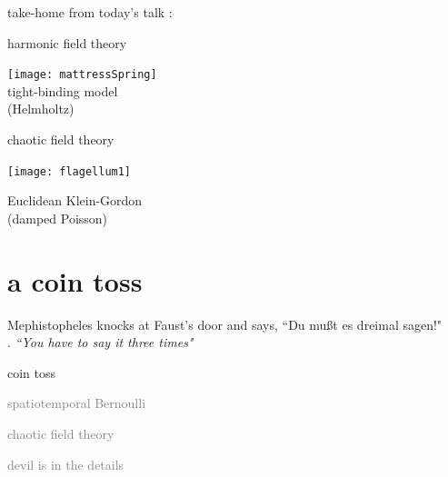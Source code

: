 \begin{frame}{take-home from today's talk :}
\begin{center}
            \begin{minipage}[c]{0.40\textwidth}\begin{center}
{\color{purple}harmonic} field theory
\bigskip

\texttt{[image: mattressSpring]}\\
{\color{blue}tight-binding} model \\ ({\color{blue}Helmholtz})
            \end{center}\end{minipage}
            \hspace{2ex}
            \begin{minipage}[c]{0.46\textwidth}\begin{center}
{\color{purple}chaotic} field theory\\
\bigskip
\bigskip
\bigskip

\texttt{[image: flagellum1]}\\
\bigskip

Euclidean {\color{blue}Klein-Gordon} \\ (damped {\color{blue}Poisson})
            \end{center}\end{minipage}
\end{center}
\end{frame}%

\section[a coin toss]
 {a coin toss}

\begin{frame}{}
\begin{bartlett}{
Mephistopheles knocks at Faust's door and says, ``Du
mu{\ss}t es dreimal sagen!"
\\{\color{yellow}.}\qquad
{\scriptsize\emph{``You have to say it three times"}}
        }
\end{bartlett}
\vfill
\begin{enumerate}
              \item {\Large
coin toss
                  }\textcolor{gray}{\small
              \item
{\color{orange}spatio}{temporal Bernoulli}
              \item
chaotic field theory
              \item
devil is in the details
                    }
            \end{enumerate}
\end{frame}

